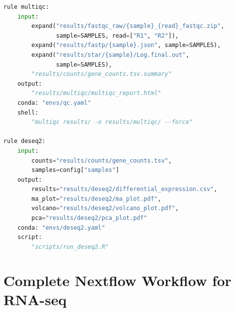 \begin{lstlisting}[language=Python, caption={Complete Snakemake workflow for
bulk RNA-seq analysis with STAR alignment and featureCounts quantification.},
label={lst:rnaseq:snakemake}]
rule multiqc:
    input:
        expand("results/fastqc_raw/{sample}_{read}_fastqc.zip",
               sample=SAMPLES, read=["R1", "R2"]),
        expand("results/fastp/{sample}.json", sample=SAMPLES),
        expand("results/star/{sample}/Log.final.out",
               sample=SAMPLES),
        "results/counts/gene_counts.tsv.summary"
    output:
        "results/multiqc/multiqc_report.html"
    conda: "envs/qc.yaml"
    shell:
        "multiqc results/ -o results/multiqc/ --force"

rule deseq2:
    input:
        counts="results/counts/gene_counts.tsv",
        samples=config["samples"]
    output:
        results="results/deseq2/differential_expression.csv",
        ma_plot="results/deseq2/ma_plot.pdf",
        volcano="results/deseq2/volcano_plot.pdf",
        pca="results/deseq2/pca_plot.pdf"
    conda: "envs/deseq2.yaml"
    script:
        "scripts/run_deseq2.R"
\end{lstlisting}


\section{Complete Nextflow Workflow for RNA-seq}
\label{sec:rnaseq:nextflow}

